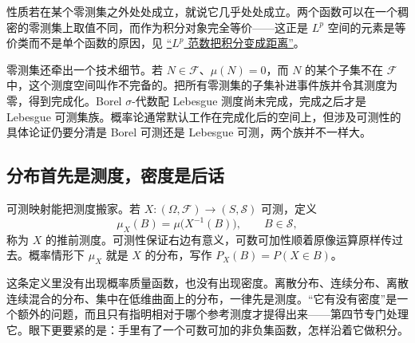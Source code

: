 性质若在某个零测集之外处处成立，就说它几乎处处成立。两个函数可以在一个稠密的零测集上取值不同，而作为积分对象完全等价——这正是 \(L^p\) 空间的元素是等价类而不是单个函数的原因，见 \hyperref[sec:12-Real-Analysis-Support/07-Lp-Spaces-and-Function-Geometry/01]{``\(L^p\) 范数把积分变成距离''}。

零测集还牵出一个技术细节。若 \(N\in\mathcal F\)、\(\mu(N)=0\)，而 \(N\) 的某个子集不在 \(\mathcal F\) 中，这个测度空间叫作不完备的。把所有零测集的子集补进事件族并令其测度为零，得到完成化。Borel \(\sigma\)-代数配 Lebesgue 测度尚未完成，完成之后才是 Lebesgue 可测集族。概率论通常默认工作在完成化后的空间上，但涉及可测性的具体论证仍要分清是 Borel 可测还是 Lebesgue 可测，两个族并不一样大。

\subsection{分布首先是测度，密度是后话}

可测映射能把测度搬家。若 \(X:(\Omega,\mathcal F)\to(S,\mathcal S)\) 可测，定义
\[
\mu_X(B)=\mu\bigl(X^{-1}(B)\bigr),\qquad B\in\mathcal S,
\]
称为 \(X\) 的推前测度。可测性保证右边有意义，可数可加性顺着原像运算原样传过去。概率情形下 \(\mu_X\) 就是 \(X\) 的分布，写作 \(P_X(B)=P(X\in B)\)。

这条定义里没有出现概率质量函数，也没有出现密度。离散分布、连续分布、离散连续混合的分布、集中在低维曲面上的分布，一律先是测度。``它有没有密度''是一个额外的问题，而且只有指明相对于哪个参考测度才提得出来——第四节专门处理它。眼下更要紧的是：手里有了一个可数可加的非负集函数，怎样沿着它做积分。
